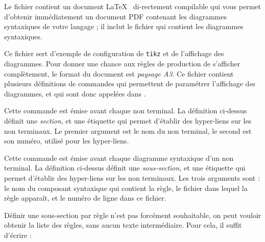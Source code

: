 
Le fichier  contient un document \LaTeX~ di-rectement compilable qui vous permet d'obtenir immédiatement un document PDF contenant les diagrammes syntaxiques de votre langage ; il inclut le fichier   qui contient les diagrammes syntaxiques.

Ce fichier sert d'exemple de configuration de \texttt{tikz} et de l'affichage des diagrammes. Pour donner une chance aux règles de production de s'afficher complètement, le format du document est \emph{paysage A3}. Ce fichier contient plusieurs définitions de commandes qui permettent de paramétrer l'affichage des diagrammes, et qui sont donc appelées dans .





Cette commande est émise avant chaque non terminal. La définition ci-dessus définit une \emph{section}, et une étiquette qui permet d'établir des hyper-liens sur les non terminaux. Le premier argument est le nom du non terminal, le second est son numéro, utilisé pour les hyper-liens.




Cette commande est émise avant chaque diagramme syntaxique d'un non terminal. La définition ci-dessus définit une \emph{sous-section}, et une étiquette qui permet d'établir des hyper-liens sur les non terminaux. Les trois arguments sont : le nom du composant syntaxique qui contient la règle, le fichier dans lequel  la règle apparaît, et le numéro de ligne dans ce fichier.

Définir une sous-section par règle n'est pas forcément souhaitable, on peut vouloir obtenir la liste des règles, sans aucun texte intermédiaire. Pour cela, il suffit d'écrire :


